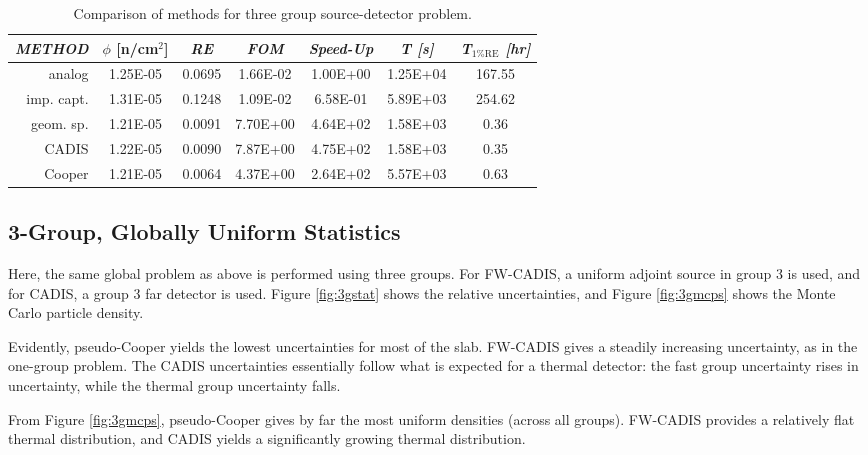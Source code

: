 \begin{table*}[th]
 \caption{Comparison of methods for three group source-detector problem.}
 \begin{center} 
{\small
 \begin{tabular*}{0.80\textwidth}{@{\extracolsep{\fill}} rcccccc } 
  \toprule 
   \emph{ METHOD}  &  $\phi$ [n/cm$^2$]  &  \emph{ RE} & \emph{ FOM} &  \emph{ Speed-Up}
& \emph{ T [s]} & \emph{ T$_{\mathrm{1\% RE}}$ [hr]} \\
  \midrule 
   analog      & 1.25E-05 & 0.0695 & 1.66E-02 & 1.00E+00 & 1.25E+04 & 167.55 \\
   imp. capt.  & 1.31E-05 & 0.1248 & 1.09E-02 & 6.58E-01 & 5.89E+03 & 254.62 \\
   geom. sp.   & 1.21E-05 & 0.0091 & 7.70E+00 & 4.64E+02 & 1.58E+03 &  0.36 \\
   CADIS       & 1.22E-05 & 0.0090 & 7.87E+00 & 4.75E+02 & 1.58E+03 & 0.35 \\ 
   Cooper      & 1.21E-05 & 0.0064 & 4.37E+00 & 2.64E+02 & 5.57E+03 & 0.63 \\
  \bottomrule 
 \end{tabular*} 
}
 \end{center} 
 \label{tbl:3gsd}  
\end{table*}



\subsection{3-Group, Globally Uniform Statistics}

Here, the same global problem as above is performed using three groups.  For
FW-CADIS, a uniform adjoint source in group 3 is used, and for CADIS, a group 3
far detector is used.  Figure \ref{fig:3gstat} shows the relative uncertainties,
and Figure \ref{fig:3gmcps} shows the Monte Carlo particle density.  

Evidently, pseudo-Cooper yields the lowest uncertainties for most of the slab. 
FW-CADIS gives a steadily increasing uncertainty, as in the one-group problem. 
The CADIS uncertainties essentially follow what is expected for a thermal
detector: the fast group uncertainty rises in uncertainty, while the thermal
group uncertainty falls.  

From Figure \ref{fig:3gmcps}, pseudo-Cooper gives by far the most uniform
densities (across all groups).  FW-CADIS provides a relatively flat thermal
distribution, and CADIS yields a significantly growing thermal distribution.

